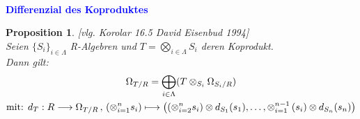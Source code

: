 \documentclass[10pt,a4paper]{report}
\newcommand{\ModulsOfDifferenzials}{David Eisenbud 1994}
\newcounter{Aussage}[chapter]
\newtheorem{prop}[Aussage]{Proposition}
\newcommand{\function}[5]{\nolinebreak{#1:#2 \longrightarrow #3 \, , \, #4 \longmapsto #5}}
\newcommand{\divR}[2]{\Omega_{#1/#2}}
\newcommand{\divf}[1]{d_{#1}}
\newcommand{\Tensor}[3]{#1 \otimes_{#2} #3}
\newcommand{\tensor}[3]{#1 \otimes #3}
\begin{document}
\ \\
\textcolor{blue}{\textbf{Differenzial des Koproduktes}}
\begin{prop} \label{Differenzial des Koproduktes} \textit{[vlg. Korolar 16.5 \ModulsOfDifferenzials]}\\
Seien $\lbrace S_i \rbrace_{i \in \Lambda}$ R-Algebren und $T = \bigotimes_{i \in \Lambda} S_i$ deren Koprodukt.\\
Dann gilt:
\begin{gather*}
\divR{T}{R} = \bigoplus_{i\in \Lambda} ( \Tensor{T}{S_i}{\divR{S_i}{R}} )\\
\text{mit: }\function{\divf{T}}{R}{\divR{T}{R}}{\left(\otimes_{i = 1}^n s_i\right)}{\left(\tensor{\left(\otimes_{i = 2}^n s_i\right)}{S_1}{\divf{S_1}(s_1)},\dots,\tensor{\otimes_{i = 1}^{n - 1}\left( s_i \right)}{S_n}{\divf{S_n}}(s_n)\right)}
\end{gather*}
\end{prop}
\end{document}
